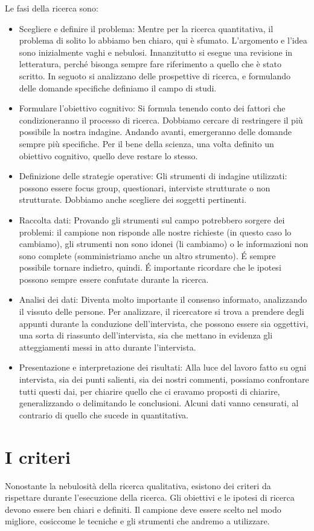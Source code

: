 Le fasi della ricerca sono:
\begin{itemize}
\item Scegliere e definire il problema: Mentre per la ricerca quantitativa, il problema di solito lo abbiamo ben chiaro, qui è sfumato. L'argomento e l'idea sono inizialmente vaghi e nebulosi. Innanzitutto si esegue una revisione in letteratura, perché bisonga sempre fare riferimento a quello che è stato scritto. In seguoto si analizzano delle prospettive di ricerca, e formulando delle domande specifiche definiamo il campo di studi.
\item Formulare l'obiettivo cognitivo: Si formula tenendo conto dei fattori che condizioneranno il processo di ricerca. Dobbiamo cercare di restringere il più possibile la nostra indagine. Andando avanti, emergeranno delle domande sempre più specifiche. Per il bene della scienza, una volta definito un obiettivo cognitivo, quello deve restare lo stesso.
\item Definizione delle strategie operative: Gli strumenti di indagine utilizzati: possono essere focus group, questionari, interviste strutturate o non strutturate. Dobbiamo anche scegliere dei soggetti pertinenti.
\item Raccolta dati: Provando gli strumenti sul campo potrebbero sorgere dei problemi: il campione non risponde alle nostre richieste (in questo caso lo cambiamo), gli strumenti non sono idonei (li cambiamo) o le informazioni non sono complete (somministriamo anche un altro strumento). \'E sempre possibile tornare indietro, quindi. \'E importante ricordare che le ipotesi possono sempre essere confutate durante la ricerca.
\item Analisi dei dati: Diventa molto importante il consenso informato, analizzando il vissuto delle persone. Per analizzare, il ricercatore si trova a prendere degli appunti durante la conduzione dell'intervista, che possono essere sia oggettivi, una sorta di riassunto dell'intervista, sia che mettano in evidenza gli atteggiamenti messi in atto durante l'intervista.
\item Presentazione e interpretazione dei risultati: Alla luce del lavoro fatto su ogni intervista, sia dei punti salienti, sia dei nostri commenti, possiamo confrontare tutti questi dai, per chiarire quello che ci eravamo proposti di chiarire, generalizzando o delimitando le conclusioni. Alcuni dati vanno censurati, al contrario di quello che sucede in quantitativa.
\end{itemize}

\section{I criteri}
Nonostante la nebulosità della ricerca qualitativa, esistono dei criteri da rispettare durante l'esecuzione della ricerca. 
Gli obiettivi e le ipotesi di ricerca devono essere ben chiari e definiti.
Il campione deve essere scelto nel modo migliore, cosiccome le tecniche e gli strumenti che andremo a utilizzare.

